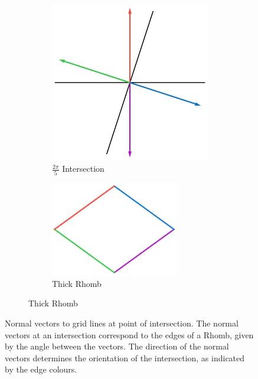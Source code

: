 \documentclass[
  oneside,
  11pt, a4paper,
  footinclude=true,
  headinclude=true,
  cleardoublepage=empty
]{scrbook}
\begin{document}
\begin{figure}[H]
\begin{subfigure}[b]{\textwidth}
\begin{subfigure}[b]{0.4\textwidth}
\centering
\includegraphics[width=\textwidth]{Intersection2Norms}
\caption{$\frac{2\pi}{5}$ Intersection}
\end{subfigure}\hfill \Large \raisebox{80px}{$\rightarrow$}\hfil
\begin{subfigure}[b]{0.5\textwidth}
\centering
\includegraphics[width=0.8\textwidth]{ColouredFatRhomb}
\caption{Thick Rhomb}
\end{subfigure}
\end{subfigure}
\caption[Intersection Normals and their Rhombs]{Normal vectors to grid lines at point of intersection. The normal vectors at an intersection correspond to the edges of a Rhomb, given by the angle between the vectors. The direction of the normal vectors determines the orientation of the intersection, as indicated by the edge colours. }
\label{fig:intersectionsnorms}
\end{figure}
\end{document}
